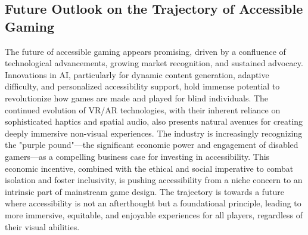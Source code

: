 \subsection{Future Outlook on the Trajectory of Accessible Gaming}

The future of accessible gaming appears promising, driven by a confluence of technological advancements, growing market recognition, and sustained advocacy. Innovations in AI, particularly for dynamic content generation, adaptive difficulty, and personalized accessibility support, hold immense potential to revolutionize how games are made and played for blind individuals. The continued evolution of VR/AR technologies, with their inherent reliance on sophisticated haptics and spatial audio, also presents natural avenues for creating deeply immersive non-visual experiences.
The industry is increasingly recognizing the "purple pound"—the significant economic power and engagement of disabled gamers—as a compelling business case for investing in accessibility\supercite{ScopeGamingReport}. This economic incentive, combined with the ethical and social imperative to combat isolation and foster inclusivity, is pushing accessibility from a niche concern to an intrinsic part of mainstream game design. The trajectory is towards a future where accessibility is not an afterthought but a foundational principle, leading to more immersive, equitable, and enjoyable experiences for all players, regardless of their visual abilities.
